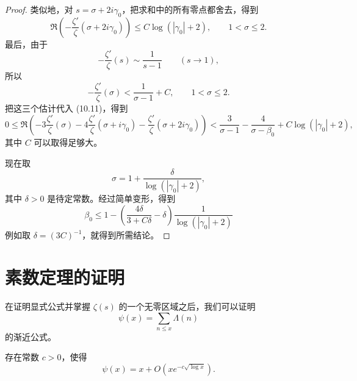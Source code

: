 \begin{proof}
	类似地，对 $s=\sigma+2i\gamma_0$，把求和中的所有零点都舍去，得到
	\[
		\Re\left(
			-\frac{\zeta'}{\zeta}(\sigma+2i\gamma_0)
		\right)
		\leq
		C\log(|\gamma_0|+2),
		\qquad
		1<\sigma\leq2.
	\]
	最后，由于
	\[
		-\frac{\zeta'}{\zeta}(s)\sim\frac1{s-1}
		\qquad(s\to1),
	\]
	所以
	\[
		-\frac{\zeta'}{\zeta}(\sigma)
		<
		\frac1{\sigma-1}+C,
		\qquad
		1<\sigma\leq2.
	\]
	把这三个估计代入 (10.11)，得到
	\[
		0
		\leq
		\Re\left(
			-3\frac{\zeta'}{\zeta}(\sigma)
			-4\frac{\zeta'}{\zeta}(\sigma+i\gamma_0)
			-\frac{\zeta'}{\zeta}(\sigma+2i\gamma_0)
		\right)
		<
		\frac3{\sigma-1}
		-
		\frac4{\sigma-\beta_0}
		+
		C\log(|\gamma_0|+2),
	\]
	其中 $C$ 可以取得足够大。

	现在取
	\[
		\sigma
		=
		1+\frac{\delta}{\log(|\gamma_0|+2)},
	\]
	其中 $\delta>0$ 是待定常数。经过简单变形，得到
	\[
		\beta_0
		\leq
		1
		-
		\left(
			\frac{4\delta}{3+C\delta}
			-
			\delta
		\right)
		\frac1{\log(|\gamma_0|+2)}
	\]
	例如取 $\delta=(3C)^{-1}$，就得到所需结论。
\end{proof}

\section{素数定理的证明}

在证明显式公式并掌握 $\zeta(s)$ 的一个无零区域之后，我们可以证明
\[
	\psi(x)=\sum_{n\leq x}\Lambda(n)
\]
的渐近公式。

\begin{theorem}
	存在常数 $c>0$，使得
	\[
		\psi(x)
		=
		x+O\left(xe^{-c\sqrt{\log x}}\right).
	\]
\end{theorem}

